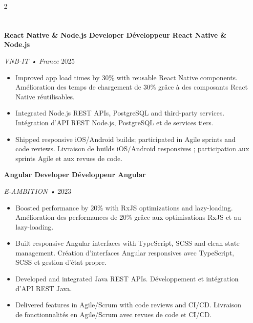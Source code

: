 \documentclass[10pt,a4paper]{article}
\begin{document}
\begin{paracol}{2}
\section*{}


\textbf{
{React Native \& Node.js Developer}
{Développeur React Native \& Node.js}
}

\textit{VNB-IT • France}
\hfill
2025



\begin{itemize}
\item {}
{Improved app load times by 30\% with reusable React Native components. } {Amélioration des temps de chargement de 30\% grâce à des composants React Native réutilisables.}
\item {}
{Integrated Node.js REST APIs, PostgreSQL and third-party services. } {Intégration d'API REST Node.js, PostgreSQL et de services tiers.}
\item {}
{Shipped responsive iOS/Android builds; participated in Agile sprints and code reviews. } {Livraison de builds iOS/Android responsives ; participation aux sprints Agile et aux revues de code.}
\end{itemize}


\vspace{0.7em}


\textbf{
{Angular Developer}
{Développeur Angular}
}

\textit{E-AMBITION • }
\hfill
2023


\begin{itemize}
\item {}
{Boosted performance by 20\% with RxJS optimizations and lazy-loading. }{Amélioration des performances de 20\% grâce aux optimisations RxJS et au lazy-loading.}
\item {}
{Built responsive Angular interfaces with TypeScript, SCSS and clean state management. }{Création d'interfaces Angular responsives avec TypeScript, SCSS et gestion d'état propre.}
\item {}
{Developed and integrated Java REST APIs. }{Développement et intégration d'API REST Java.}
\item {}
{Delivered features in Agile/Scrum with code reviews and CI/CD. }{Livraison de fonctionnalités en Agile/Scrum avec revues de code et CI/CD.}
\end{itemize}



\end{paracol}
\end{document}

